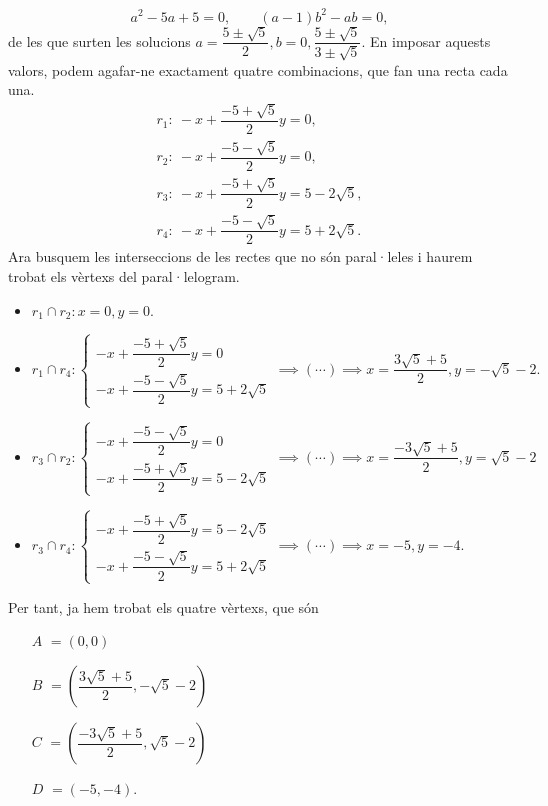\documentclass[11pt]{article}
\begin{document}
\[
a^2-5a+5=0,\qquad (a-1)b^2-ab=0,
\]
de les que surten les solucions $a=\dfrac{5\pm\sqrt{5}}{2},b=0,\dfrac{5\pm\sqrt{5}}{3\pm\sqrt{5}}.$ En imposar aquests valors, podem agafar-ne exactament quatre combinacions, que fan una recta cada una.
\[
\begin{aligned}
r_1:\ -x+\dfrac{-5+\sqrt{5}}{2}y=0,\\
r_2:\ -x+\dfrac{-5-\sqrt{5}}{2}y=0,\\
r_3:\ -x+\dfrac{-5+\sqrt{5}}{2}y=5-2\sqrt{5},\\
r_4:\ -x+\dfrac{-5-\sqrt{5}}{2}y=5+2\sqrt{5}.
\end{aligned}
\]
Ara busquem les interseccions de les rectes que no són paral·leles i haurem trobat els vèrtexs del paral·lelogram.
\begin{itemize}
	\item $r_1\cap r_2:x=0,y=0.$
	\item $r_1\cap r_4:\begin{cases}
	-x+\dfrac{-5+\sqrt{5}}{2}y=0\\
	-x+\dfrac{-5-\sqrt{5}}{2}y=5+2\sqrt{5}
	\end{cases}\implies(\cdots)\implies x=\dfrac{3\sqrt{5}+5}{2},y=-\sqrt{5}-2.$
	\item $r_3\cap r_2:\begin{cases}
	-x+\dfrac{-5-\sqrt{5}}{2}y=0\\
	-x+\dfrac{-5+\sqrt{5}}{2}y=5-2\sqrt{5}
	\end{cases}\implies(\cdots)\implies x=\dfrac{-3\sqrt{5}+5}{2},y=\sqrt{5}-2$
	\item $r_3\cap r_4:\begin{cases}
	-x+\dfrac{-5+\sqrt{5}}{2}y=5-2\sqrt{5}\\
	-x+\dfrac{-5-\sqrt{5}}{2}y=5+2\sqrt{5}
	\end{cases}\implies(\cdots)\implies x=-5,y=-4.$
\end{itemize}
Per tant, ja hem trobat els quatre vèrtexs, que són
\begin{itemize}
	\item[$A$]$=(0,0)$
	\item[$B$]$=(\dfrac{3\sqrt{5}+5}{2},-\sqrt{5}-2)$
	\item[$C$]$=(\dfrac{-3\sqrt{5}+5}{2},\sqrt{5}-2)$
	\item[$D$]$=(-5,-4).$
\end{itemize}
\newpage
\end{document}
